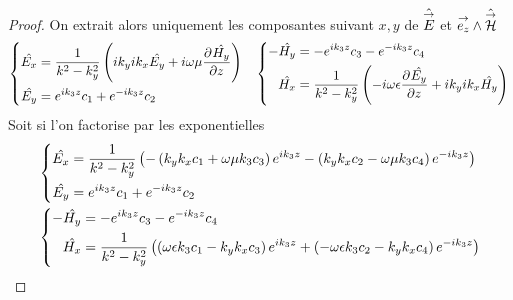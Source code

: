 \begin{proof}
            On extrait alors uniquement les composantes suivant \(x,y\) de \(\hat{\vE}\) et \(\vect{e_z} \pvect \hat{\vH}\)
            \begin{align*}
              \left\lbrace
              \begin{aligned}
                \hat{E_x} &= \frac{1}{k^2 - k_y^2}\left(ik_yik_x\hat{E_y} + i\w\mu\ddr{z}{\hat{H_y}}\right)
                \\
                \hat{E_y} &= e^{ik_3z}c_1 + e^{-ik_3z}c_2
              \end{aligned}
              \right.
              &&
              \left\lbrace
              \begin{aligned}
                -\hat{H_y} &= -e^{ik_3z}c_3 - e^{-ik_3z}c_4
                \\
                \hat{H_x} &= \frac{1}{k^2 - k_y^2}\left(-i\w\eps\ddr{z}{\hat{E_y}} + ik_yik_x\hat{H_y}\right)
              \end{aligned}
              \right.
            \end{align*}
            Soit si l'on factorise par les exponentielles
            \begin{align*}
              &\left\lbrace
              \begin{aligned}
                \hat{E_x} &= \frac{1}{k^2 - k_y^2}\left(-\left(k_yk_x c_1 + \w\mu k_3 c_3 \right)e^{ik_3z} - \left(k_yk_xc_2 - \w\mu k_3 c_4\right)e^{-ik_3z}\right)
                \\
                \hat{E_y} &= e^{ik_3z}c_1 + e^{-ik_3z}c_2
              \end{aligned}
              \right.
              \\
              &\left\lbrace
              \begin{aligned}
                -\hat{H_y} &= -e^{ik_3z}c_3 - e^{-ik_3z}c_4
                \\
                \hat{H_x} &= \frac{1}{k^2 - k_y^2}\left(\left(\w\eps k_3c_1 - k_y k_x c_3\right)e^{ik_3z} + \left(-\w\eps k_3c_2 - k_y k_x c_4\right)e^{-ik_3z}\right)
              \end{aligned}
              \right.
            \end{align*}


\end{proof}
